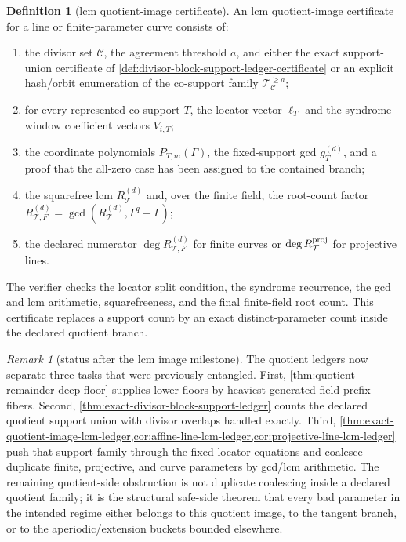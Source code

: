 \documentclass[11pt]{article}
\theoremstyle{definition}
\newtheorem{definition}[theorem]{Definition}
\theoremstyle{remark}
\newtheorem{remark}[theorem]{Remark}
\begin{document}
\begin{definition}[lcm quotient-image certificate]
\label{def:lcm-quotient-image-certificate}
An lcm quotient-image certificate for a line or finite-parameter curve consists
of:
\begin{enumerate}[label=\textup{(\roman*)},leftmargin=2.2em]
\item the divisor set $\mathcal C$, the agreement threshold $a$, and either the
exact support-union certificate of \cref{def:divisor-block-support-ledger-certificate}
or an explicit hash/orbit enumeration of the co-support family
$\mathcal T_{\mathcal C}^{\ge a}$;
\item for every represented co-support $T$, the locator vector
$\boldsymbol\ell_T$ and the syndrome-window coefficient vectors $V_{i,T}$;
\item the coordinate polynomials $P_{T,m}(\Gamma)$, the fixed-support gcd
$g_T^{(d)}$, and a proof that the all-zero case has been assigned to the
contained branch;
\item the squarefree lcm $R_{\mathcal T}^{(d)}$ and, over the finite field, the
root-count factor $R_{\mathcal T,F}^{(d)}=\gcd(R_{\mathcal T}^{(d)},\Gamma^q-\Gamma)$;
\item the declared numerator $\deg R_{\mathcal T,F}^{(d)}$ for finite curves or
$\deg R_{\mathcal T}^{\rm proj}$ for projective lines.
\end{enumerate}
The verifier checks the locator split condition, the syndrome recurrence, the
gcd and lcm arithmetic, squarefreeness, and the final finite-field root count.
This certificate replaces a support count by an exact distinct-parameter count
inside the declared quotient branch.
\end{definition}

\begin{remark}[status after the lcm image milestone]
\label{rem:lcm-image-milestone-status}
The quotient ledgers now separate three tasks that were previously entangled.
First, \cref{thm:quotient-remainder-deep-floor} supplies lower floors by
heaviest generated-field prefix fibers.  Second,
\cref{thm:exact-divisor-block-support-ledger} counts the declared quotient
support union with divisor overlaps handled exactly.  Third,
\cref{thm:exact-quotient-image-lcm-ledger,cor:affine-line-lcm-ledger,cor:projective-line-lcm-ledger}
push that support family through the fixed-locator equations and coalesce
duplicate finite, projective, and curve parameters by gcd/lcm arithmetic.  The
remaining quotient-side obstruction is not duplicate coalescing inside a declared
quotient family; it is the structural safe-side theorem that every bad parameter
in the intended regime either belongs to this quotient image, to the tangent
branch, or to the aperiodic/extension buckets bounded elsewhere.
\end{remark}
\end{document}
